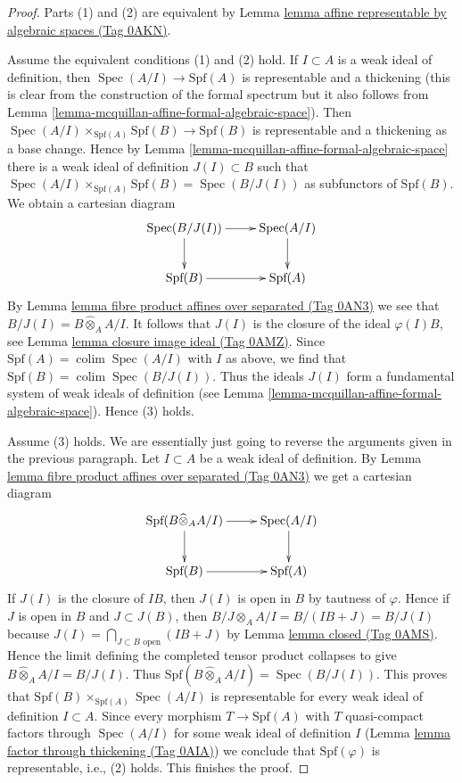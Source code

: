\documentclass{amsart}
\theoremstyle{plain}
\theoremstyle{definition}
\theoremstyle{remark}
\numberwithin{equation}{subsection}
\def\colim{\mathop{\mathrm{colim}}\nolimits}
\def\Spec{\mathop{\mathrm{Spec}}}
\begin{document}
\begin{proof}
Parts (1) and (2) are equivalent by
Lemma \href{https://stacks.math.columbia.edu/tag/0AKN}{lemma affine representable by algebraic spaces (Tag 0AKN)}.

\medskip\noindent
Assume the equivalent conditions (1) and (2) hold.
If $I \subset A$ is a weak ideal of definition, then
$\Spec(A/I) \to \text{Spf}(A)$ is representable and a thickening
(this is clear from the construction of the formal spectrum
but it also follows from
Lemma \ref{lemma-mcquillan-affine-formal-algebraic-space}).
Then $\Spec(A/I) \times_{\text{Spf}(A)} \text{Spf}(B) \to \text{Spf}(B)$
is representable and a thickening as a base change.
Hence by
Lemma \ref{lemma-mcquillan-affine-formal-algebraic-space}
there is a weak ideal of definition $J(I) \subset B$ such that
$\Spec(A/I) \times_{\text{Spf}(A)} \text{Spf}(B) = \Spec(B/J(I))$
as subfunctors of $\text{Spf}(B)$. We obtain a cartesian diagram
$$
\xymatrix{
\Spec(B/J(I)) \ar[d] \ar[r] & \Spec(A/I) \ar[d] \\
\text{Spf}(B) \ar[r] & \text{Spf}(A)
}
$$
By Lemma \href{https://stacks.math.columbia.edu/tag/0AN3}{lemma fibre product affines over separated (Tag 0AN3)}
we see that $B/J(I) = B \widehat{\otimes}_A A/I$.
It follows that $J(I)$ is the closure of the ideal $\varphi(I)B$, see
Lemma \href{https://stacks.math.columbia.edu/tag/0AMZ}{lemma closure image ideal (Tag 0AMZ)}.
Since $\text{Spf}(A) = \colim \Spec(A/I)$ with $I$ as above,
we find that $\text{Spf}(B) = \colim \Spec(B/J(I))$.
Thus the ideals $J(I)$ form a fundamental system of weak
ideals of definition (see
Lemma \ref{lemma-mcquillan-affine-formal-algebraic-space}).
Hence (3) holds.

\medskip\noindent
Assume (3) holds. We are essentially just going to reverse the
arguments given in the previous paragraph.
Let $I \subset A$ be a weak ideal of definition.
By Lemma \href{https://stacks.math.columbia.edu/tag/0AN3}{lemma fibre product affines over separated (Tag 0AN3)}
we get a cartesian diagram
$$
\xymatrix{
\text{Spf}(B \widehat{\otimes}_A A/I) \ar[d] \ar[r] & \Spec(A/I) \ar[d] \\
\text{Spf}(B) \ar[r] & \text{Spf}(A)
}
$$
If $J(I)$ is the closure of $IB$, then $J(I)$ is open in $B$
by tautness of $\varphi$. Hence if $J$ is open in $B$ and $J \subset J(B)$,
then $B/J \otimes_A A/I = B/(IB + J) = B/J(I)$ because
$J(I) = \bigcap_{J \subset B\text{ open}} (IB + J)$ by Lemma \href{https://stacks.math.columbia.edu/tag/0AMS}{lemma closed (Tag 0AMS)}.
Hence the limit defining the completed tensor product collapses to give
$B \widehat{\otimes}_A A/I = B/J(I)$.
Thus $\text{Spf}(B \widehat{\otimes}_A A/I) = \Spec(B/J(I))$.
This proves that $\text{Spf}(B) \times_{\text{Spf}(A)} \Spec(A/I)$
is representable for every weak ideal of definition $I \subset A$.
Since every morphism $T \to \text{Spf}(A)$ with $T$ quasi-compact
factors through $\Spec(A/I)$ for some weak ideal of definition $I$
(Lemma \href{https://stacks.math.columbia.edu/tag/0AIA}{lemma factor through thickening (Tag 0AIA)})
we conclude that $\text{Spf}(\varphi)$ is representable, i.e.,
(2) holds. This finishes the proof.
\end{proof}
\end{document}
